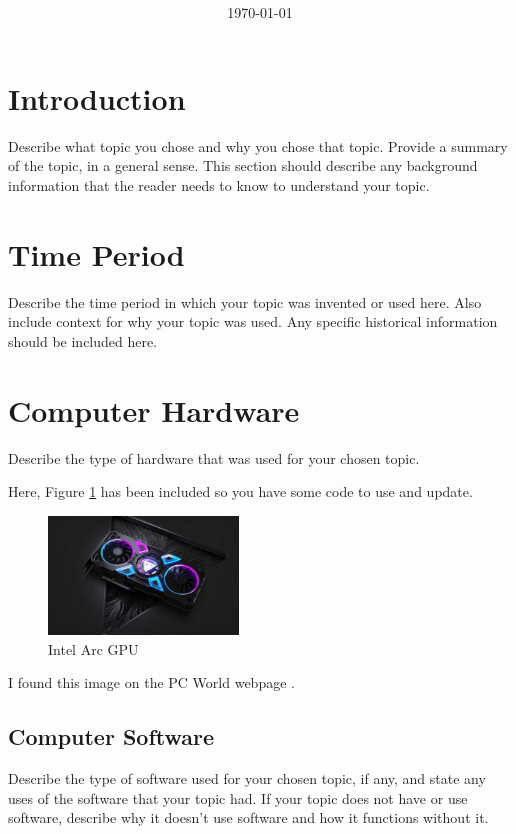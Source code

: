 \documentclass[11pt, twocolumn]{article}
\title{{\large } \thetitle}
\author{\theauthor}
\date{\today}
\begin{document}
\maketitle

\thispagestyle{firstpage}

\section{Introduction}
Describe what topic you chose and why you chose that topic. Provide a summary of
the topic, in a general sense. This section should describe any background 
information that the reader needs to know to understand your topic.

\section{Time Period}
Describe the time period in which your topic was invented or used here. Also include
context for why your topic was used. Any specific historical information should be 
included here.

\section{Computer Hardware}
Describe the type of hardware that was used for your chosen topic.

Here, Figure \ref{fig:gpu} has been included so you have some code to use and update.
\begin{figure}
    \centering
    \includegraphics[width=0.45\textwidth]{gpu}
    \caption{Intel Arc GPU}
    \label{fig:gpu}
\end{figure}

I found this image on the PC World webpage \cite{Ung21}. 

\subsection{Computer Software}
Describe the type of software used for your chosen topic, if any, and state any uses
of the software that your topic had. If your topic does not have or use software, 
describe why it doesn't use software and how it functions without it.
\end{document}
